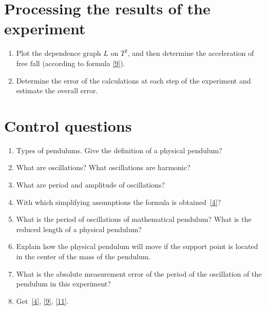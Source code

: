 \documentclass{LabWorkEng}
\begin{document}
\section{Processing the results of the experiment}

\begin{enumerate}
	\item Plot the dependence graph $L$ on $T^2$, and then determine the acceleration of free fall (according to formula \eqref{9}).
	\item Determine the error of the calculations at each step of the experiment and estimate the overall error.
\end{enumerate}


\section*{Control questions}
\begin{enumerate}
	\item Types of pendulums. Give the definition of a physical pendulum?
	\item What are oscillations? What oscillations are harmonic?
	\item What are period and amplitude of oscillations?
	\item With which simplifying assumptions the formula is obtained~\eqref{4}?
	\item What is the period of oscillations of mathematical pendulum? What is the reduced length of a physical pendulum?
	\item Explain how the physical pendulum will move if the support point is located in the center of the mass of the pendulum.
	\item What is the absolute measurement error of the period of the oscillation of the pendulum in this experiment?
	\item Get~\eqref{4}, \eqref{9}, \eqref{11}.
\end{enumerate}
\end{document}
